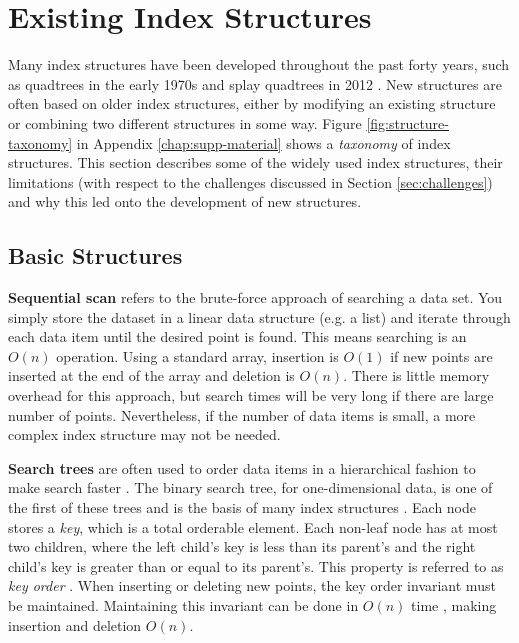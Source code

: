 \section{Existing Index Structures}
\label{sec:structures}

Many index structures have been developed throughout the past forty years, such as quadtrees in the early 1970s \cite{quadtree} and splay quadtrees in 2012 \cite{splay-quadtree}. New structures are often based on older index structures, either by modifying an existing structure or combining two different structures in some way. Figure \ref{fig:structure-taxonomy} in Appendix \ref{chap:supp-material} shows a \textit{taxonomy} of index structures. This section describes some of the widely used index structures, their limitations (with respect to the challenges discussed in Section \ref{sec:challenges}) and why this led onto the development of new structures.

\subsection{Basic Structures}
\label{sec:basic-structures}

\textbf{Sequential scan} refers to the brute-force approach of searching a data set. You simply store the dataset in a linear data structure (e.g. a list) and iterate through each data item until the desired point is found. This means searching is an $O(n)$ operation. Using a standard array, insertion is $O(1)$ if new points are inserted at the end of the array and deletion is $O(n)$. There is little memory overhead for this approach, but search times will be very long if there are large number of points. Nevertheless, if the number of data items is small, a more complex index structure may not be needed.

\textbf{Search trees} are often used to order data items in a hierarchical fashion to make search faster \cite{introduction-to-algorithms}. The binary search tree, for one-dimensional data, is one of the first of these trees and is the basis of many index structures \cite{introduction-to-algorithms}. Each node stores a \textit{key}, which is a total orderable element. Each non-leaf node has at most two children, where the left child's key is less than its parent's and the right child's key is greater than or equal to its parent's. This property is referred to as \textit{key order} \cite{rst}. When inserting or deleting new points, the key order invariant must be maintained. Maintaining this invariant can be done in $O(n)$ time \cite{introduction-to-algorithms}, making insertion and deletion $O(n)$.

